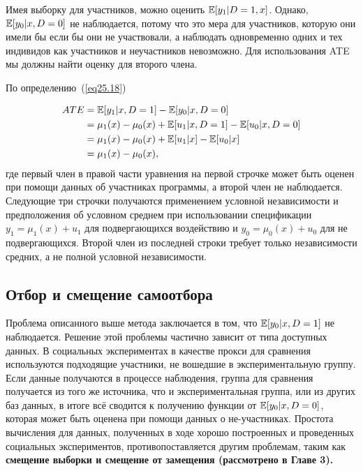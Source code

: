 Имея выборку для участников, можно оценить $\mathbb{E} [y_1 | D = 1, x]$. Однако, $\mathbb{E}[y_0 | x, D = 0]$ не наблюдается, потому что это мера для участников, которую они имели бы если бы они не участвовали, а наблюдать одновременно одних и тех индивидов как участников и неучастников невозможно. Для использования ATE мы должны найти оценку для второго члена. 

По определению~(\ref{eq25.18})

\begin{align}
\label{eq25.20}
ATE & =  \mathbb{E}[ y_1 | x, D = 1] - \mathbb{E}[ y_0 | x , D = 0 ]  \\
& =  \mu_1(x) - \mu_0(x) + \mathbb{E}[ u_1 | x, D = 1] - \mathbb{E}[ u_0 | x , D = 0 ]  \nonumber \\
& =  \mu_1(x) - \mu_0(x) + \mathbb{E}[ u_1 | x] - \mathbb{E}[ u_0 | x ] \nonumber \\
& =  \mu_1(x) - \mu_0(x),
\end{align}
где первый член в правой части уравнения на первой строчке может быть оценен при помощи данных об участниках программы, а второй член не наблюдается. Следующие три строчки получаются применением условной независимости и предположения об условном среднем при использовании спецификации $y_1 = \mu_1(x) + u_1$ для подвергающихся воздействию и $y_0 = \mu_0 (x) + u_0$ для не подвергающихся. Второй член из последней строки требует только независимости средних, а не полной условной независимости. 

\subsection{Отбор и смещение самоотбора}

Проблема описанного выше метода заключается в том, что $\mathbb{E} [y_0 | x, D = 1]$ не наблюдается. Решение этой проблемы частично зависит от типа доступных данных. В социальных экспериментах в качестве прокси для сравнения используются подходящие участники, не вошедшие в экспериментальную группу. Если данные получаются в процессе наблюдения, группа для сравнения получается из того же источника, что и экспериментальная группа, или из других баз данных, в итоге всё сводится к получению функции от $\mathbb{E}[y_0 | x, D = 0]$, которая может быть оценена при помощи данных о не-участниках. Простота вычисления для данных, полученных в ходе хорошо построенных и проведенных социальных экспериментов, противопоставляется другим проблемам, таким как \bfseries смещение выборки \mdseries и \bfseries смещение от замещения \mdseries (рассмотрено в Главе 3). 

